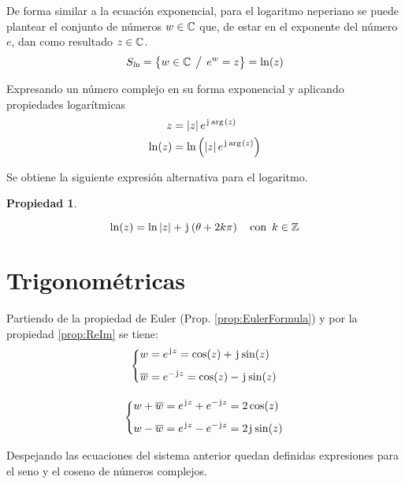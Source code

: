 \documentclass[a5paper,12pt,twoside]{book}
\newtheorem{prop}{{Propiedad}}[chapter]
\begin{document}
De forma similar a la ecuación exponencial, para el logaritmo neperiano se puede plantear el conjunto de números $w \in \mathbb{C}$ que, de estar en el exponente del número $e$, dan como resultado $z \in \mathbb{C}$.
\begin{equation*}
    {{S}_\textsl{{ln}}} = { \left\{ {w \in \mathbb{C} \hspace{1ex} \big/ \hspace{1ex} e^w = z} \right\} } = \ln(z)
\end{equation*}

Expresando un número complejo en su forma exponencial y aplicando propiedades logarítmicas
\begin{align*}
    z &= {\left| {z} \right|} \, e^{\mkern2mu\mathrm{j}\mkern1mu \mathop{\mathrm{arg}}\mkern2mu(z)}
    \\
    \ln (z) &= \ln \left( {\left| {z} \right|} \, e^{\mkern2mu\mathrm{j}\mkern1mu \mathop{\mathrm{arg}}\mkern2mu(z)} \right)
\end{align*}

Se obtiene la siguiente expresión alternativa para el logaritmo.

\begin{mdframed}[style=PropertyFrame]
    \begin{prop}
    \end{prop}
    \begin{equation*}
        \ln(z) = \ln {\left| {z} \right|} + \mkern2mu\mathrm{j}\mkern1mu \left( \theta + 2 k\pi \right) \quad \textrm{con} \enspace k \in \mathbb{Z}
    \end{equation*}
\end{mdframed}


\section{Trigonométricas}

Partiendo de la propiedad de Euler (Prop. \ref{prop:EulerFormula}) y por la propiedad \ref{prop:ReIm} se tiene:
\begin{gather*}
    \left\{
    \begin{aligned}
        w &= e^{\mkern2mu\mathrm{j}\mkern1mu z} = \cos(z) + \mkern2mu\mathrm{j}\mkern1mu \sin(z)
        \\[1ex]
        \overline{w} &= e^{-\mkern2mu\mathrm{j}\mkern1mu z} = \cos(z) - \mkern2mu\mathrm{j}\mkern1mu \sin(z)
    \end{aligned}
    \right.
    \\[1em]
    \left\{
    \begin{aligned}
        w + \overline{w} &= e^{\mkern2mu\mathrm{j}\mkern1mu z} + e^{-\mkern2mu\mathrm{j}\mkern1mu z} = 2 \cos(z)
        \\[1ex]
        w - \overline{w} &= e^{\mkern2mu\mathrm{j}\mkern1mu z} - e^{-\mkern2mu\mathrm{j}\mkern1mu z} = 2 \mkern2mu\mathrm{j}\mkern1mu \sin(z)
    \end{aligned}
    \right.
\end{gather*}

Despejando las ecuaciones del sistema anterior quedan definidas expresiones para el seno y el coseno de números complejos.
\end{document}
